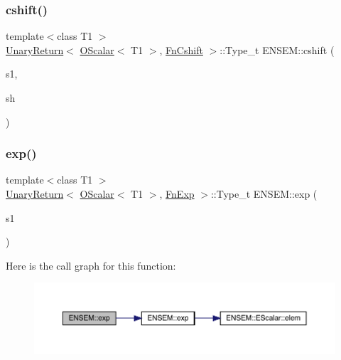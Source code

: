 \subsubsection{\texorpdfstring{cshift()}{cshift()}}
{\footnotesize\ttfamily template$<$class T1 $>$ \\
\mbox{\hyperlink{structENSEM_1_1UnaryReturn}{Unary\+Return}}$<$ \mbox{\hyperlink{classENSEM_1_1OScalar}{O\+Scalar}}$<$ T1 $>$, \mbox{\hyperlink{structENSEM_1_1FnCshift}{Fn\+Cshift}} $>$\+::Type\+\_\+t E\+N\+S\+E\+M\+::cshift (\begin{DoxyParamCaption}\item[{const \mbox{\hyperlink{classENSEM_1_1OScalar}{O\+Scalar}}$<$ T1 $>$ \&}]{s1,  }\item[{int}]{sh }\end{DoxyParamCaption})\hspace{0.3cm}{\ttfamily [inline]}}

\mbox{\label{group__obsscalar_ga9d0d193a9c41dfb71083e25b3fdc6a01}} 
\subsubsection{\texorpdfstring{exp()}{exp()}}
{\footnotesize\ttfamily template$<$class T1 $>$ \\
\mbox{\hyperlink{structENSEM_1_1UnaryReturn}{Unary\+Return}}$<$ \mbox{\hyperlink{classENSEM_1_1OScalar}{O\+Scalar}}$<$ T1 $>$, \mbox{\hyperlink{structENSEM_1_1FnExp}{Fn\+Exp}} $>$\+::Type\+\_\+t E\+N\+S\+E\+M\+::exp (\begin{DoxyParamCaption}\item[{const \mbox{\hyperlink{classENSEM_1_1OScalar}{O\+Scalar}}$<$ T1 $>$ \&}]{s1 }\end{DoxyParamCaption})\hspace{0.3cm}{\ttfamily [inline]}}

Here is the call graph for this function\+:\nopagebreak
\begin{figure}[H]
\begin{center}
\leavevmode
\includegraphics[width=350pt]{d1/d71/group__obsscalar_ga9d0d193a9c41dfb71083e25b3fdc6a01_cgraph}
\end{center}
\end{figure}
\mbox{\label{group__obsscalar_gaab3ff43b1817abbbfb1caf2c90110a0f}} 
